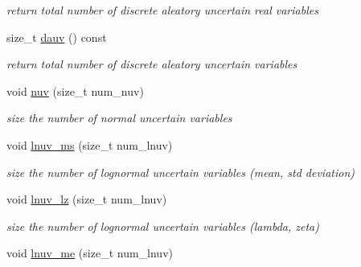 \begin{DoxyCompactItemize}
\begin{DoxyCompactList}\small\item\em return total number of discrete aleatory uncertain real variables \end{DoxyCompactList}\item 
size\+\_\+t \hyperlink{classPecos_1_1AleatoryDistParams_a61f915292fb3436821f318190c278d66}{dauv} () const \label{classPecos_1_1AleatoryDistParams_a61f915292fb3436821f318190c278d66}

\begin{DoxyCompactList}\small\item\em return total number of discrete aleatory uncertain variables \end{DoxyCompactList}\item 
void \hyperlink{classPecos_1_1AleatoryDistParams_a2000ea350bec08740347cf2b2dc95169}{nuv} (size\+\_\+t num\+\_\+nuv)\label{classPecos_1_1AleatoryDistParams_a2000ea350bec08740347cf2b2dc95169}

\begin{DoxyCompactList}\small\item\em size the number of normal uncertain variables \end{DoxyCompactList}\item 
void \hyperlink{classPecos_1_1AleatoryDistParams_a23d9a821292896bf5e1b2d59a0bed437}{lnuv\+\_\+ms} (size\+\_\+t num\+\_\+lnuv)\label{classPecos_1_1AleatoryDistParams_a23d9a821292896bf5e1b2d59a0bed437}

\begin{DoxyCompactList}\small\item\em size the number of lognormal uncertain variables (mean, std deviation) \end{DoxyCompactList}\item 
void \hyperlink{classPecos_1_1AleatoryDistParams_aaeece243c82fd9a4d55dab73b1fa88ca}{lnuv\+\_\+lz} (size\+\_\+t num\+\_\+lnuv)\label{classPecos_1_1AleatoryDistParams_aaeece243c82fd9a4d55dab73b1fa88ca}

\begin{DoxyCompactList}\small\item\em size the number of lognormal uncertain variables (lambda, zeta) \end{DoxyCompactList}\item 
void \hyperlink{classPecos_1_1AleatoryDistParams_a30a322fec067654e804da7b2090e2b1a}{lnuv\+\_\+me} (size\+\_\+t num\+\_\+lnuv)\label{classPecos_1_1AleatoryDistParams_a30a322fec067654e804da7b2090e2b1a}


\end{DoxyCompactItemize}
